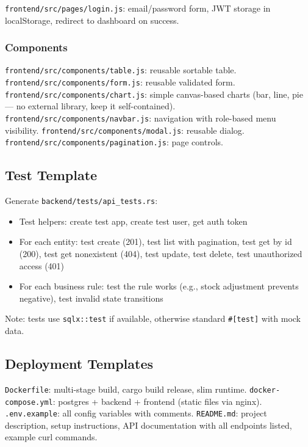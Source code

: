 \documentclass[11pt,a4paper]{article}
\begin{document}
\texttt{frontend/src/pages/login.js}: email/password form, JWT storage in
localStorage, redirect to dashboard on success.

\subsubsection{Components}

\texttt{frontend/src/components/table.js}: reusable sortable table.
\texttt{frontend/src/components/form.js}: reusable validated form.
\texttt{frontend/src/components/chart.js}: simple canvas-based charts
(bar, line, pie --- no external library, keep it self-contained).
\texttt{frontend/src/components/navbar.js}: navigation with role-based
menu visibility.
\texttt{frontend/src/components/modal.js}: reusable dialog.
\texttt{frontend/src/components/pagination.js}: page controls.

\subsection{Test Template}

Generate \texttt{backend/tests/api\_tests.rs}:
\begin{itemize}
\item Test helpers: create test app, create test user, get auth token
\item For each entity: test create (201), test list with pagination,
  test get by id (200), test get nonexistent (404), test update,
  test delete, test unauthorized access (401)
\item For each business rule: test the rule works (e.g., stock adjustment
  prevents negative), test invalid state transitions
\end{itemize}

Note: tests use \texttt{sqlx::test} if available, otherwise standard
\texttt{\#[test]} with mock data.

\subsection{Deployment Templates}

\texttt{Dockerfile}: multi-stage build, cargo build release, slim runtime.
\texttt{docker-compose.yml}: postgres + backend + frontend (static files via nginx).
\texttt{.env.example}: all config variables with comments.
\texttt{README.md}: project description, setup instructions, API documentation
with all endpoints listed, example curl commands.
\end{document}

